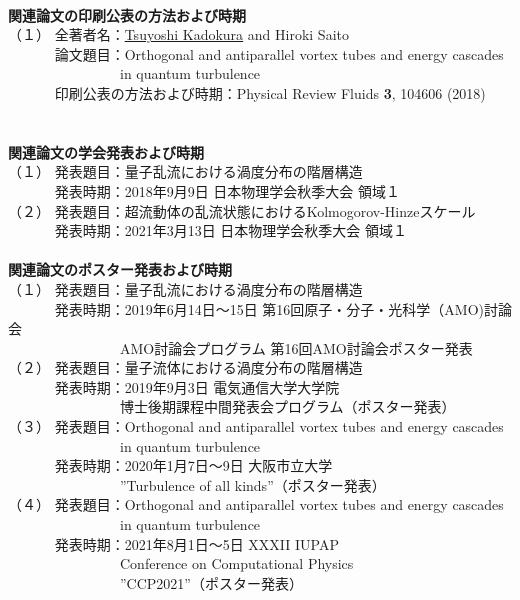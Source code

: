 \documentclass[12pt,a4paper]{jbook}
\begin{document}
	\newpage
	\
	\\
	{\bf 関連論文の印刷公表の方法および時期}
	\\
	（１） 全著者名：\underline{Tsuyoshi Kadokura} and Hiroki Saito
	\\
	　　 　論文題目：Orthogonal and antiparallel vortex tubes and energy cascades 
	\\
	 　　　　　　　　in quantum turbulence
	\\
	　 　　印刷公表の方法および時期：Physical Review Fluids {\bf 3}, 104606 (2018)
	\\
	\\
    \\
	{\bf 関連論文の学会発表および時期}
	\\
	（１） 発表題目：量子乱流における渦度分布の階層構造
	\\
	　 　　発表時期：2018年9月9日 日本物理学会秋季大会 領域１
	\\
	（２） 発表題目：超流動体の乱流状態におけるKolmogorov-Hinzeスケール
	\\
	　 　　発表時期：2021年3月13日 日本物理学会秋季大会 領域１
	\\
	\\
	{\bf 関連論文のポスター発表および時期}
	\\
	（１） 発表題目：量子乱流における渦度分布の階層構造
	\\
	　 　　発表時期：2019年6月14日～15日 第16回原子・分子・光科学（AMO)討論会
	\\
	　　　　　　　　AMO討論会プログラム 第16回AMO討論会ポスター発表
	\\
	（２） 発表題目：量子流体における渦度分布の階層構造
	\\
	　 　　発表時期：2019年9月3日 電気通信大学大学院
	\\
	　　　　　　　　博士後期課程中間発表会プログラム（ポスター発表）
	\\
	（３） 発表題目：Orthogonal and antiparallel vortex tubes and energy cascades
	\\
	　　　　　　　　in quantum turbulence
	\\
	　 　　発表時期：2020年1月7日～9日 大阪市立大学 
	\\
	　　　　　　　　''Turbulence of all kinds''（ポスター発表）
	\\
	（４） 発表題目：Orthogonal and antiparallel vortex tubes and energy cascades
	\\
	　　　　　　　　in quantum turbulence
	\\
	　 　　発表時期：2021年8月1日～5日 XXXII IUPAP
	\\　　　　　　　　Conference on Computational Physics
	\\
	　　　　　　　　''CCP2021''（ポスター発表）
\end{document}
